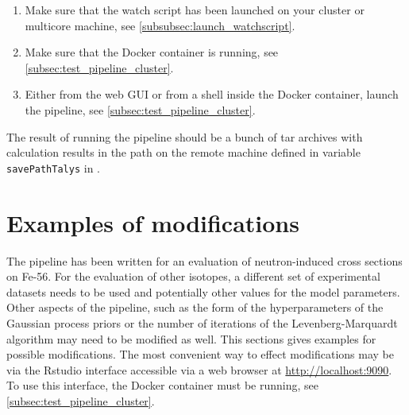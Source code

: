 \documentclass[12pt,a4paper]{scrartcl}
\begin{document}
\begin{enumerate}
  \item Make sure that the watch script has been launched on your cluster or multicore machine, see \cref{subsubsec:launch_watchscript}.
  \item Make sure that the Docker container is running, see \cref{subsec:test_pipeline_cluster}.
  \item Either from the web GUI or from a shell inside the Docker container, launch the pipeline, see \cref{subsec:test_pipeline_cluster}.
   
\end{enumerate}  

The result of running the pipeline should be a bunch of tar archives with calculation results in the path on the remote machine defined in variable \verb#savePathTalys# in \mbox{}.

 \section{Examples of modifications}
 The pipeline has been written for an evaluation of neutron-induced cross sections on \mbox{Fe-56}.
 For the evaluation of other isotopes, a different set of experimental datasets needs to be used and potentially other values for the model parameters.
 Other aspects of the pipeline, such as the form of the hyperparameters of the Gaussian process priors or the number of iterations of the Levenberg-Marquardt algorithm may need to be modified as well.
 This sections gives examples for possible modifications.
 The most convenient way to effect modifications may be via the Rstudio interface accessible via a web browser at \url{http://localhost:9090}.
 To use this interface, the Docker container must be running, see \cref{subsec:test_pipeline_cluster}.
 
\end{document}
